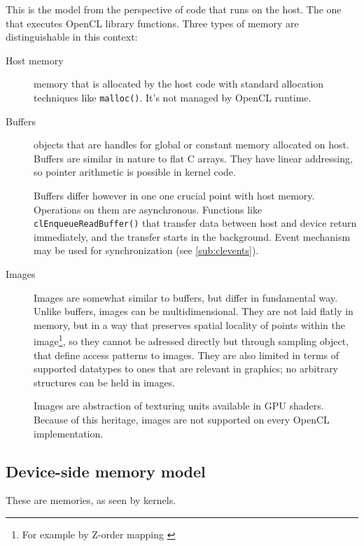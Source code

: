 This is the model from the perspective of code that runs on the host. The one
that executes OpenCL library functions. Three types of memory are distinguishable
in this context:

\begin{description}
  \item[Host memory]
    memory that is allocated by the host code with standard allocation techniques
    like \texttt{malloc()}. It's not managed by OpenCL runtime.
  \item[Buffers]
    objects that are handles for global or constant memory allocated on host.
    Buffers are similar in nature to flat C arrays. They have linear addressing,
    so pointer arithmetic is possible in kernel code.

    Buffers differ however in one one crucial point with host memory. Operations
    on them are asynchronous. Functions like \texttt{clEnqueue\-Read\-Buffer()} that
    transfer data between host and device return immediately, and the transfer
    starts in the background. Event mechanism may be used for synchronization
    (see \autoref{sub:clevents}).
  \item[Images]
    Images are somewhat similar to buffers, but differ in fundamental way.
    Unlike buffers, images can be multidimensional. They are not laid flatly in
    memory, but in a way that preserves spatial locality of points within the
    image\footnote{For example by Z-order mapping \parencite{gaster2012heterogeneous}},
    so they cannot be adressed directly but through sampling object, that define
    access patterns to images. They are also limited in terms of supported
    datatypes to ones that are relevant in graphics; no arbitrary structures can
    be held in images.

    Images are abstraction of texturing units available in GPU shaders. Because
    of this heritage, images are not supported on every OpenCL implementation.

\end{description}

\subsection{Device-side memory model}

These are memories, as seen by kernels.

